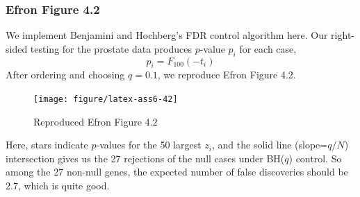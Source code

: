 \documentclass{article}\usepackage{graphicx, color}
\newenvironment{knitrout}{}{} %
\begin{document}
\subsubsection*{Efron Figure 4.2}
\hspace{12 pt} We implement Benjamini and Hochberg's FDR control
algorithm here. Our right-sided testing for the prostate data
produces $p$-value $p_i$ for each case, 
\begin{displaymath}
p_i = F_{100}(-t_i)
\end{displaymath}
After ordering and choosing $q=0.1$, we reproduce Efron Figure 4.2. 

\begin{knitrout}
\color{fgcolor}\begin{figure}[]


{\centering \texttt{[image: figure/latex-ass6-42]} 

}

\caption[Reproduced Efron Figure 4]{Reproduced Efron Figure 4.2\label{fig:ass6-42}}
\end{figure}


\end{knitrout}


Here, stars indicate $p$-values for the 50 largest $z_i$, and the
solid line (slope=$q/N$) intersection gives us the 27
rejections of the null cases under BH($q$) control. So among the
27 non-null genes, the expected number of 
false discoveries should be 2.7, which is quite good.
\end{document}

